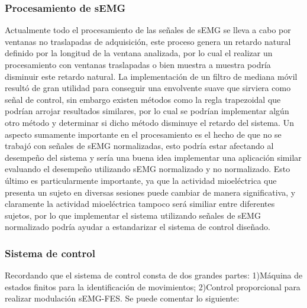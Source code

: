\subsubsection*{Procesamiento de sEMG}
Actualmente todo el procesamiento de las señales de sEMG se lleva a cabo por ventanas no traslapadas de adquisición, este proceso genera un retardo natural definido por la longitud de la ventana analizada, por lo cual el realizar un procesamiento con ventanas traslapadas o bien muestra a muestra podría disminuir este retardo natural. La implementación de un filtro de mediana móvil resultó de gran utilidad para conseguir una envolvente suave que sirviera como señal de control, sin embargo existen métodos como la regla trapezoidal que podrían arrojar resultados similares, por lo cual se podrían implementar algún otro método y determinar si dicho método disminuye el retardo del sistema. Un aspecto sumamente importante en el procesamiento es el hecho de que no se trabajó con señales de sEMG normalizadas, esto podría estar afectando al desempeño del sistema y sería una buena idea implementar una aplicación similar evaluando el desempeño utilizando sEMG normalizado y no normalizado. Esto último es particularmente importante, ya que la actividad mioeléctrica que presenta un sujeto en diversas sesiones puede cambiar de manera significativa, y claramente la actividad mioeléctrica tampoco será similiar entre diferentes sujetos, por lo que implementar el sistema utilizando señales de sEMG normalizado podría ayudar a estandarizar el sistema de control diseñado.

\subsubsection*{Sistema de control}
Recordando que el sistema de control consta de dos grandes partes: 1)Máquina de estados finitos para la identificación de movimientos; 2)Control proporcional para realizar modulación sEMG-FES. Se puede comentar lo siguiente:


